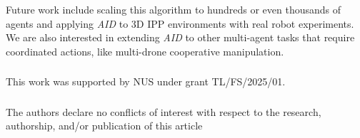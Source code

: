 \documentclass[runningheads]{llncs}
\begin{document}
Future work include scaling this algorithm to hundreds or even thousands of agents and applying \textit{AID} to 3D IPP environments with real robot experiments. We are also interested in extending \textit{AID} to other multi-agent tasks that require coordinated actions, like multi-drone cooperative manipulation.

\begin{credits}

\subsubsection{\ackname} This work was supported by NUS under grant TL/FS/2025/01.
\subsubsection{\discintname} The authors declare no conflicts of interest with respect to the research, authorship, and/or publication of this article
\end{credits}

\newpage


\end{document}

